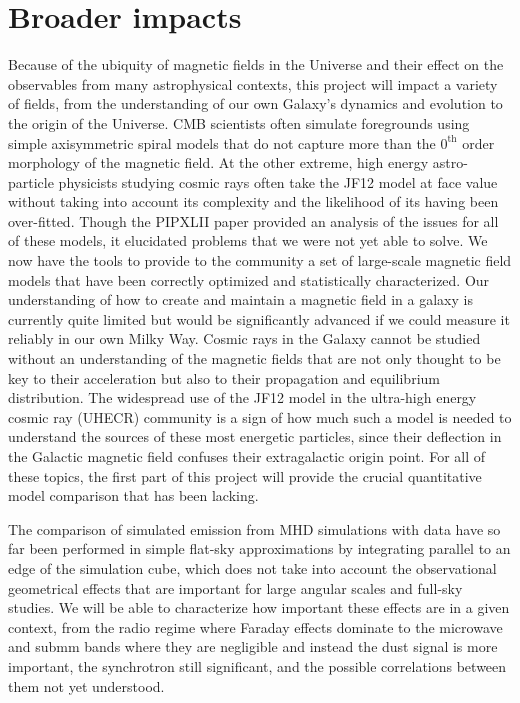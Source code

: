 \documentclass[12pt]{article}
\begin{document}
\section*{Broader impacts}

Because of the ubiquity of magnetic fields in the Universe and their effect on the observables from many astrophysical contexts, this project will impact a variety of fields, from the understanding of our own Galaxy's dynamics and evolution to the origin of the Universe.  CMB scientists often simulate foregrounds using simple axisymmetric spiral models that do not capture more than the $0^\mathrm{th}$ order morphology of the magnetic field. At the other extreme, high energy astro-particle physicists studying cosmic rays often take the JF12 model at face value without taking into account its complexity and the likelihood of its having been over-fitted. Though the PIPXLII paper provided an analysis of the issues for all of these models, it elucidated problems that we were not yet able to solve. We now have the tools to provide to the community a set of large-scale magnetic field models that have been correctly optimized and statistically characterized.  Our understanding of how to create and maintain a magnetic field in a galaxy is currently quite limited but would be significantly advanced if we could measure it reliably in our own Milky Way.  Cosmic rays in the Galaxy cannot be studied without an understanding of the magnetic fields that are not only thought to be key to their acceleration but also to their propagation and equilibrium distribution.  The widespread use of the JF12 model in the ultra-high energy cosmic ray (UHECR) community is a sign of how much such a model is needed to understand the sources of these most energetic particles, since their deflection in the Galactic magnetic field confuses their extragalactic origin point.  For all of these topics, the first part of this project will provide the crucial quantitative model comparison that has been lacking.  

The comparison of simulated emission from MHD simulations with data have so far been performed in simple flat-sky approximations by integrating parallel to an edge of the simulation cube, which does not take into account the observational geometrical effects that are important for large angular scales and full-sky studies. We will be able to characterize how important these effects are in a given context, from the radio regime where Faraday effects dominate to the microwave and submm bands where they are negligible and instead the dust signal is more important, the synchrotron still significant, and the possible correlations between them not yet understood.  
\end{document}
